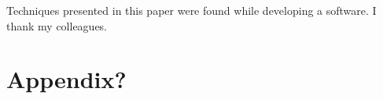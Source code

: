 \documentclass[acmsmall]{acmart}
\begin{document}
\maketitle






\begin{acks}
Techniques presented in this paper were found while developing a software.
I thank my colleagues.
\end{acks}




\appendix

\section{Appendix?}
\end{document}
